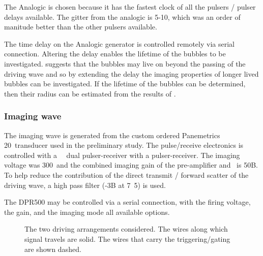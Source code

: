 The Analogic is chosen because it has the fastest clock of all the pulsers / pulser delays available.
The gitter from the analogic is  5-10\nano\second, which was an order of manitude better than the other pulsers available.


The time delay on the Analogic generator is controlled remotely via serial connection.
Altering the delay enables the lifetime of the bubbles to be investigated.
\Figref{} suggests that the bubbles may live on beyond the passing of the driving wave
and so by extending the delay the imaging properties of longer lived bubbles can be investigated.
If the lifetime of the bubbles can be determined, then their radius can be estimated 
from the results of .


\subsubsection{Imaging wave}
The imaging wave is generated from the custom ordered Panemetrics \unit{20}\mega\hertz\
transducer used in the preliminary study.
The pulse/receive electronics is controlled 
with a \JsrUltrasonics\ \ dual pulser-receiver
with a  pulser-receiver.
The imaging voltage was \unit{300}\volt\ and the combined imaging gain 
of the pre-amplifier and \DPR500\ is \unit{50}\deci B.
To help reduce the contribution of the direct transmit / forward scatter of
the driving wave, a high pass filter (-\unit{3}\deci B at \unit{7.5}\mega\hertz)
is used.

The DPR500 may be controlled via a serial connection,
with the  firing voltage, the gain,
and the imaging mode all available options.



\begin{centering}
\begin{figure}[h]%
   \hspace{.3in}
   \caption{
     The two driving arrangements considered.
     The wires along which signal travels are solid.
     The wires that carry the triggering/gating are shown dashed.
   }
   \label{fig:arrangements}
\end{figure}
\end{centering}


